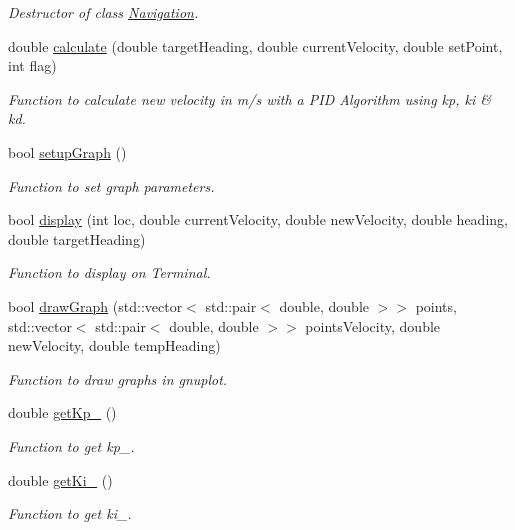 \begin{DoxyCompactItemize}
\begin{DoxyCompactList}\small\item\em Destructor of class \hyperlink{class_navigation}{Navigation}. \end{DoxyCompactList}\item 
double \hyperlink{class_navigation_a0f83b511cec12a68f2c3466c40c5d3cb}{calculate} (double target\+Heading, double current\+Velocity, double set\+Point, int flag)
\begin{DoxyCompactList}\small\item\em Function to calculate new velocity in m/s with a P\+ID Algorithm using kp, ki \& kd. \end{DoxyCompactList}\item 
bool \hyperlink{class_navigation_af6a893750980a747eccf700e22d2cbae}{setup\+Graph} ()
\begin{DoxyCompactList}\small\item\em Function to set graph parameters. \end{DoxyCompactList}\item 
bool \hyperlink{class_navigation_a8a2193deb9aff2804453b8cf585691c0}{display} (int loc, double current\+Velocity, double new\+Velocity, double heading, double target\+Heading)
\begin{DoxyCompactList}\small\item\em Function to display on Terminal. \end{DoxyCompactList}\item 
bool \hyperlink{class_navigation_a95c972751207516ff0d85af6d42e75f7}{draw\+Graph} (std\+::vector$<$ std\+::pair$<$ double, double $>$$>$ points, std\+::vector$<$ std\+::pair$<$ double, double $>$$>$ points\+Velocity, double new\+Velocity, double temp\+Heading)
\begin{DoxyCompactList}\small\item\em Function to draw graphs in gnuplot. \end{DoxyCompactList}\item 
double \hyperlink{class_navigation_ab1469d74f4838a9d32a8647d22701f9f}{get\+Kp\+\_\+} ()
\begin{DoxyCompactList}\small\item\em Function to get kp\+\_\+. \end{DoxyCompactList}\item 
double \hyperlink{class_navigation_a1a84392d6cce3f60df452ab482b5647c}{get\+Ki\+\_\+} ()
\begin{DoxyCompactList}\small\item\em Function to get ki\+\_\+. \end{DoxyCompactList}\item 

\end{DoxyCompactItemize}
